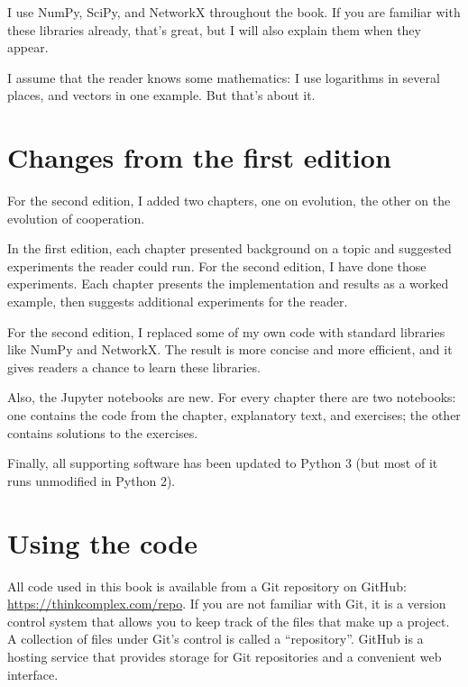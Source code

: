 \documentclass[12pt]{book}
\theoremstyle{exercise}
\begin{document}
I use NumPy, SciPy, and NetworkX throughout the book.  If you are familiar with these libraries already, that's great, but I will also explain them when they appear.


I assume that the reader knows some mathematics: I use logarithms in several places, and vectors in one example.  But that's about it.


\section{Changes from the first edition}

For the second edition, I added two chapters, one on evolution, the other on the evolution of cooperation.

In the first edition, each chapter presented background on a topic and suggested experiments the reader could run.  For the second edition, I have done those experiments.  Each chapter presents the implementation and results as a worked example, then suggests additional experiments for the reader.

For the second edition, I replaced some of my own code with standard libraries like NumPy and NetworkX.  The result is more concise and more efficient, and it gives readers a chance to learn these libraries.

Also, the Jupyter notebooks are new.  For every chapter there are two notebooks: one contains the code from the chapter, explanatory text, and exercises; the other contains solutions to the exercises.


Finally, all supporting software has been updated to Python 3 (but most of it runs unmodified in Python 2).


\section{Using the code}
\label{code}


All code used in this book is available from a Git repository on GitHub:
\url{https://thinkcomplex.com/repo}.  
If you are not familiar with Git, it is a 
version control system that allows you to keep track of the files that
make up a project.  A collection of files under Git's control is
called a ``repository''.  GitHub is a hosting service that provides
storage for Git repositories and a convenient web interface.

\end{document}
